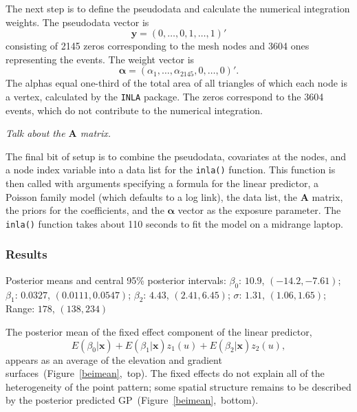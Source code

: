 \documentclass[]{interact}
\begin{document}
The next step is to define the pseudodata and calculate the numerical
integration weights. The pseudodata vector is
\begin{displaymath}
\mathbf{y} = (0, \dots, 0, 1, \dots, 1)'
\end{displaymath}
consisting of 2145 zeros corresponding to the mesh nodes and 3604 ones
representing the events. The weight vector is
\begin{displaymath}
\boldsymbol{\alpha} = (\alpha_{1}, \dots, \alpha_{2145}, 0, \dots, 0)'.
\end{displaymath}
The alphas equal one-third of the total area of all triangles of which each
node is a vertex, calculated by the \texttt{INLA} package. The zeros
correspond to the 3604 events, which do not contribute to the numerical
integration.

{\it Talk about the \(\mathbf{A}\) matrix.}

The final bit of setup is to combine the pseudodata, covariates at the nodes,
and a node index variable into a data list for the \texttt{inla()} function.
This function is then called with arguments specifying a formula for the
linear predictor, a Poisson family model (which defaults to a log link), the
data list, the \(\mathbf{A}\) matrix, the priors for the coefficients, and the
\(\boldsymbol{\alpha}\) vector as the exposure parameter. The \texttt{inla()}
function takes about 110 seconds to fit the model on a midrange laptop.


\subsubsection{Results}

Posterior means and central 95\% posterior intervals:
\(\beta_{0}\): \(10.9\), \((-14.2, -7.61)\);
\(\beta_{1}\): \(0.0327\), \((0.0111, 0.0547)\);
\(\beta_{2}\): \(4.43\), \((2.41, 6.45)\);
\(\sigma\): \(1.31\), \((1.06, 1.65)\);
Range: \(178\), \((138, 234)\)

The posterior mean of the fixed effect component of the linear predictor,
\begin{displaymath}
E(\beta_{0} | \mathbf{x}) + E(\beta_{1} | \mathbf{x}) z_{1}(u)
+ E(\beta_{2} | \mathbf{x}) z_{2}(u),
\end{displaymath}
appears as an average of the elevation and gradient
surfaces~(Figure~\ref{beimean},~top). The fixed effects do not explain all of
the heterogeneity of the point pattern; some spatial structure remains to be
described by the posterior predicted GP~(Figure~\ref{beimean},~bottom).
\end{document}
